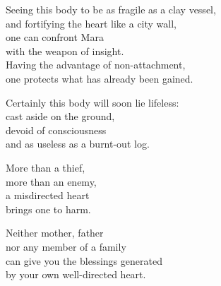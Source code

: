 Seeing this body to be as fragile as a clay vessel,\\
and fortifying the heart like a city wall,\\
one can confront Mara\\
with the weapon of insight.\\
Having the advantage of non-attachment,\\
one protects what has already been gained.


Certainly this body will soon lie lifeless:\\
cast aside on the ground,\\
devoid of consciousness\\
and as useless as a burnt-out log.


More than a thief,\\
more than an enemy,\\
a misdirected heart\\
brings one to harm.


Neither mother, father\\
nor any member of a family\\
can give you the blessings generated\\
by your own well-directed heart.


